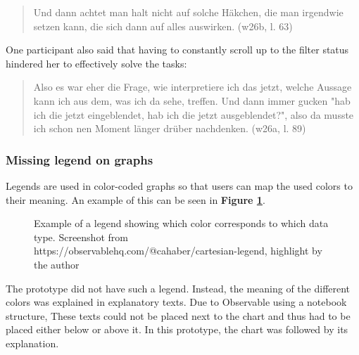 \begin{quote}
    Und dann achtet man halt nicht auf solche Häkchen, die man irgendwie setzen kann, die sich dann auf alles auswirken. (w26b, l. 63)
\end{quote}

One participant also said that having to constantly scroll up to the filter status hindered her to effectively solve the tasks:

\begin{quote}
    Also es war eher die Frage, wie interpretiere ich das jetzt, welche Aussage kann ich aus dem, was ich da sehe, treffen. Und dann immer gucken "hab ich die jetzt eingeblendet, hab ich die jetzt ausgeblendet?", also da musste ich schon nen Moment länger drüber nachdenken. (w26a, l. 89)
\end{quote}

\subsubsection*{Missing legend on graphs}
Legends are used in color-coded graphs so that users can map the used colors to their meaning. An example of this can be seen in \textbf{Figure \ref{fig:legend_example}}.

\begin{figure}[h!tb]
    \centering
    \caption{Example of a legend showing which color corresponds to which data type. Screenshot from https://observablehq.com/@cahaber/cartesian-legend, highlight by the author}
    \label{fig:legend_example}
\end{figure}

The prototype did not have such a legend. Instead, the meaning of the different colors was explained in explanatory texts. Due to Observable using a notebook structure, These texts could not be placed next to the chart and thus had to be placed either below or above it. In this prototype, the chart was followed by its explanation.%

